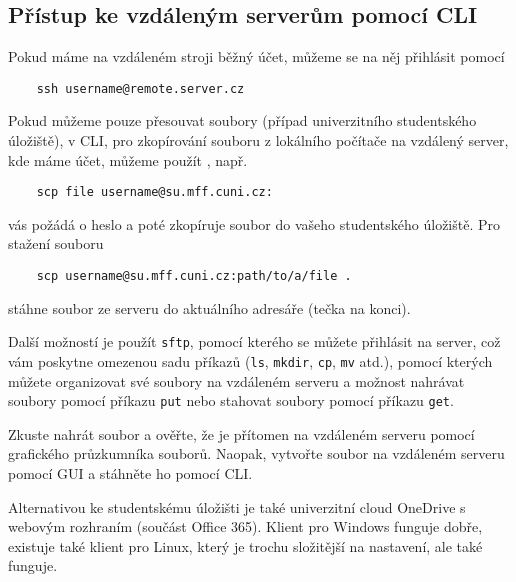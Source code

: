 \subsection{Přístup ke vzdáleným serverům pomocí CLI}
Pokud máme na vzdáleném stroji běžný účet, můžeme se na něj přihlásit pomocí
\begin{verbatim}
    ssh username@remote.server.cz
\end{verbatim}
Pokud můžeme pouze přesouvat soubory (případ univerzitního studentského úložiště), v CLI, pro zkopírování souboru z lokálního počítače na vzdálený server, kde máme účet, můžeme použít , např.
\begin{verbatim}
    scp file username@su.mff.cuni.cz:
\end{verbatim}
vás požádá o heslo a poté zkopíruje soubor do vašeho studentského úložiště. Pro stažení souboru
\begin{verbatim}
    scp username@su.mff.cuni.cz:path/to/a/file .
\end{verbatim}
stáhne soubor ze serveru do aktuálního adresáře (tečka na konci).

Další možností je použít \verb|sftp|, pomocí kterého se můžete přihlásit na server, což vám poskytne omezenou sadu příkazů (\verb|ls|, \verb|mkdir|, \verb|cp|, \verb|mv| atd.), pomocí kterých můžete organizovat své soubory na vzdáleném serveru a možnost nahrávat soubory pomocí příkazu \verb|put| nebo stahovat soubory pomocí příkazu \verb|get|.

\begin{exercise}
    Zkuste nahrát soubor a ověřte, že je přítomen na vzdáleném serveru pomocí grafického průzkumníka souborů. Naopak, vytvořte soubor na vzdáleném serveru pomocí GUI a stáhněte ho pomocí CLI.
\end{exercise}

Alternativou ke studentskému úložišti je také univerzitní cloud OneDrive s webovým rozhraním (součást Office 365). Klient pro Windows funguje dobře, existuje také klient pro Linux, který je trochu složitější na nastavení, ale také funguje.